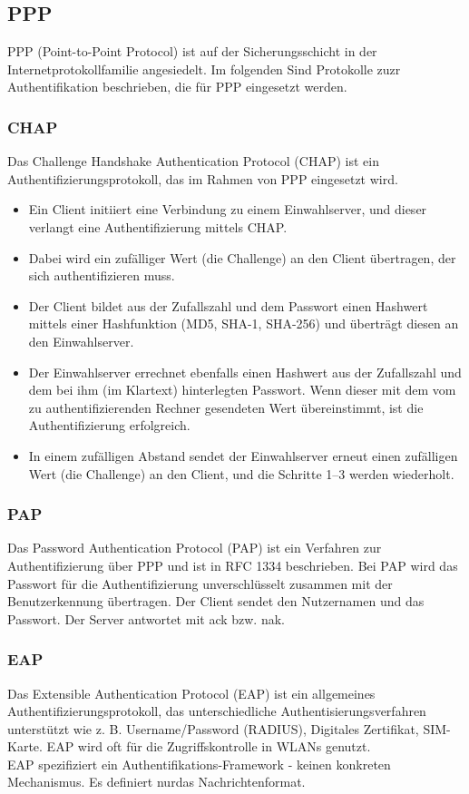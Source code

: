 \documentclass{article} %
\begin{document}
\subsection{PPP}
PPP (Point-to-Point Protocol) ist auf der Sicherungsschicht in der Internetprotokollfamilie angesiedelt. Im folgenden Sind Protokolle zuzr Authentifikation beschrieben, die für PPP eingesetzt werden.
\subsubsection{CHAP}
Das Challenge Handshake Authentication Protocol (CHAP) ist ein Authentifizierungsprotokoll, das im Rahmen von PPP eingesetzt wird. 
	\begin{itemize}
	\item Ein Client initiiert eine Verbindung zu einem Einwahlserver, und dieser verlangt eine Authentifizierung mittels CHAP. 
	\item Dabei wird ein zufälliger Wert (die Challenge) an den Client übertragen, der sich authentifizieren muss.
	\item Der Client bildet aus der Zufallszahl und dem Passwort einen Hashwert mittels einer Hashfunktion (MD5, SHA-1, SHA-256) und überträgt diesen an den Einwahlserver.
	\item Der Einwahlserver errechnet ebenfalls einen Hashwert aus der Zufallszahl und dem bei ihm (im Klartext) hinterlegten Passwort. Wenn dieser mit dem vom zu authentifizierenden Rechner gesendeten Wert übereinstimmt, ist die Authentifizierung erfolgreich.
	\item In einem zufälligen Abstand sendet der Einwahlserver erneut einen zufälligen Wert (die Challenge) an den Client, und die Schritte 1–3 werden wiederholt.
	\end{itemize}

\subsubsection{PAP}
Das Password Authentication Protocol (PAP) ist ein Verfahren zur Authentifizierung über PPP und ist in RFC 1334 beschrieben. %
Bei PAP wird das Passwort für die Authentifizierung unverschlüsselt zusammen mit der Benutzerkennung übertragen. Der Client sendet den Nutzernamen und das Passwort. Der Server antwortet mit ack bzw. nak.

\subsubsection{EAP}
Das Extensible Authentication Protocol (EAP) ist ein  allgemeines Authentifizierungsprotokoll, das unterschiedliche Authentisierungsverfahren unterstützt wie z. B. Username/Password (RADIUS), Digitales Zertifikat, SIM-Karte. EAP wird oft für die Zugriffskontrolle in WLANs genutzt.\\
EAP spezifiziert ein Authentifikations-Framework - keinen konkreten Mechanismus. Es definiert \glqq nur\grqq das Nachrichtenformat.
\end{document}
